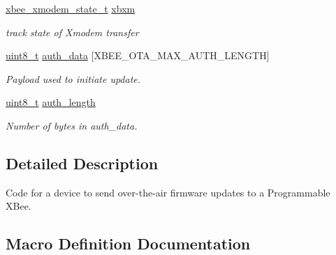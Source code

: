 \begin{DoxyCompactItemize}
\begin{tabbing}
\end{tabbing}\item 
\mbox{\label{group__xbee__ota__client_ga198adacee7500d0135a88d6ecc591bf5}} 
\hyperlink{structxbee__xmodem__state__t}{xbee\+\_\+xmodem\+\_\+state\+\_\+t} \hyperlink{group__xbee__ota__client_ga198adacee7500d0135a88d6ecc591bf5}{xbxm}
\begin{DoxyCompactList}\small\item\em track state of Xmodem transfer \end{DoxyCompactList}\item 
\mbox{\label{group__xbee__ota__client_ga93137186f6fec6ed6ba4db70db04ca1f}} 
\hyperlink{group__hal__dos_gae1affc9ca37cfb624959c866a73f83c2}{uint8\+\_\+t} \hyperlink{group__xbee__ota__client_ga93137186f6fec6ed6ba4db70db04ca1f}{auth\+\_\+data} \mbox{[}X\+B\+E\+E\+\_\+\+O\+T\+A\+\_\+\+M\+A\+X\+\_\+\+A\+U\+T\+H\+\_\+\+L\+E\+N\+G\+TH\mbox{]}
\begin{DoxyCompactList}\small\item\em Payload used to initiate update. \end{DoxyCompactList}\item 
\mbox{\label{group__xbee__ota__client_ga67b236f1ec1fbada8e400218c6e5c1f7}} 
\hyperlink{group__hal__dos_gae1affc9ca37cfb624959c866a73f83c2}{uint8\+\_\+t} \hyperlink{group__xbee__ota__client_ga67b236f1ec1fbada8e400218c6e5c1f7}{auth\+\_\+length}
\begin{DoxyCompactList}\small\item\em Number of bytes in {\ttfamily auth\+\_\+data}. \end{DoxyCompactList}\end{DoxyCompactItemize}


\subsection{Detailed Description}
\begin{DoxyVerb}     Code for a device to send over-the-air firmware updates to a
     Programmable XBee.\end{DoxyVerb}
 



\subsection{Macro Definition Documentation}
\mbox{\label{group__xbee__ota__client_gada576e1f290c08c3a5ff065a4a1504cb}} 

